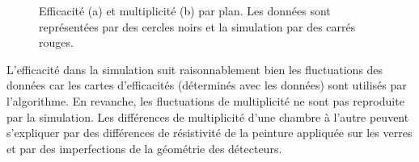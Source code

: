 \begin{figure}[!ht]
  \caption{Efficacité (a) et multiplicité (b) par plan. Les données sont représentées par des cercles noirs et la simulation par des carrés rouges.\label{fig.eff_mul_layer}}
\end{figure}
L'efficacité dans la simulation suit raisonnablement bien les fluctuations des données car les cartes d'efficacités (déterminés avec les données) sont utilisés par l'algorithme. En revanche, les fluctuations de multiplicité ne sont pas reproduite par la simulation. Les différences de multiplicité d'une chambre à l'autre peuvent s'expliquer par des différences de résistivité de la peinture appliquée sur les verres et par des imperfections de la géométrie des détecteurs.


